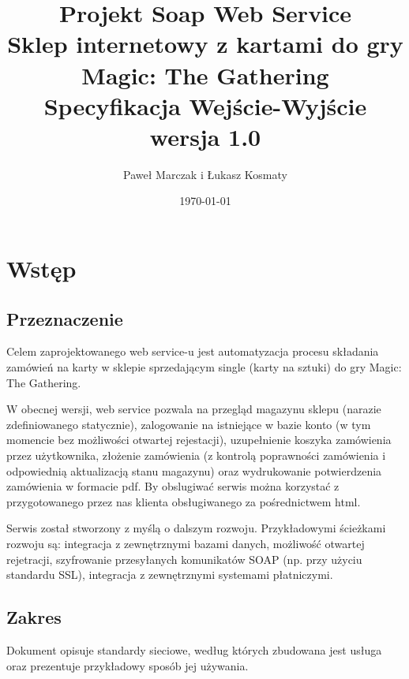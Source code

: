 \documentclass[11pt]{article}   %
\begin{document}
	\begin{titlepage}
	\title{%
		Projekt Soap Web Service\\
		\large Sklep internetowy z kartami do gry Magic: The Gathering\\
		Specyfikacja Wejście-Wyjście\\
	wersja 1.0}
	\author{Paweł Marczak i Łukasz Kosmaty}         %
	\date{\today}    %
	\maketitle
	\end{titlepage}
	\tableofcontents
	\section{Wstęp}     %
	\subsection{Przeznaczenie}
	Celem zaprojektowanego web service-u jest automatyzacja procesu składania zamówień na karty w sklepie sprzedającym single (karty na sztuki) do gry Magic: The Gathering.\par W obecnej wersji, web service pozwala na przegląd magazynu sklepu (narazie zdefiniowanego statycznie), zalogowanie na istniejące w bazie konto (w tym momencie bez możliwości otwartej rejestacji), uzupełnienie koszyka zamówienia przez użytkownika, złożenie zamówienia (z kontrolą poprawności zamówienia i odpowiednią aktualizacją stanu magazynu) oraz wydrukowanie potwierdzenia zamówienia w formacie pdf. By obslugiwać serwis można korzystać z przygotowanego przez nas klienta obsługiwanego za pośrednictwem html.\par Serwis został stworzony z myślą o dalszym rozwoju. Przykładowymi ścieżkami rozwoju są: integracja z zewnętrznymi bazami danych, możliwość otwartej rejetracji, szyfrowanie przesyłanych komunikatów SOAP (np. przy użyciu standardu SSL), integracja z zewnętrznymi systemami płatniczymi.
	\subsection{Zakres}
Dokument opisuje standardy sieciowe, według których zbudowana jest usługa oraz
prezentuje przykładowy sposób jej używania.
\end{document}
